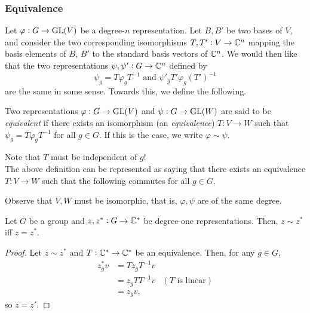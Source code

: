 		\subsubsection{Equivalence}

			Let $\varphi : G \to \operatorname{GL}(V)$ be a degree-$n$ representation. Let $B,B'$ be two bases of $V$, and consider the two corresponding isomorphisms $T,T' : V \to \mathbb{C}^n$ mapping the basis elements of $B$, $B'$ to the standard basis vectors of $\mathbb{C}^n$. We would then like that the two representations $\psi,\psi' : G \to \mathbb{C}^n$ defined by
			\[ \psi_g = T\varphi_gT^{-1} \text{ and } \psi'_g T'\varphi_g(T')^{-1} \]
			are the same in some sense. Towards this, we define the following.

			\begin{fdef}
				Two representations $\varphi : G \to \operatorname{GL}(V)$ and $\psi : G \to \operatorname{GL}(W)$ are said to be \emph{equivalent} if there exists an isomorphism (an \emph{equivalence}) $T : V \to W$ such that $\psi_g = T\varphi_gT^{-1}$ for all $g \in G$. If this is the case, we write $\varphi \sim \psi$.
			\end{fdef}

			Note that $T$ must be independent of $g$!\\
			The above definition can be represented as saying that there exists an equivalence $T : V \to W$ such that the following commutes for all $g \in G$.
			\begin{center}
			\end{center}

			Observe that $V,W$ must be isomorphic, that is, $\varphi,\psi$ are of the same degree.

			\begin{prop}
				Let $G$ be a group and $z,z^* : G \to \mathbb{C}^*$ be degree-one representations. Then, $z \sim z^*$ iff $z = z^*$.
			\end{prop}
			\begin{proof}
				Let $z \sim z^*$ and $T : \mathbb{C}^* \to \mathbb{C}^*$ be an equivalence. Then, for any $g \in G$,
				\begin{align*}
					z^*_gv &= Tz_gT^{-1}v \\
						&= z_g TT^{-1}v & (T\text{ is linear}) \\
						&= z_gv,
				\end{align*}
				so $z = z'$.
			\end{proof}

